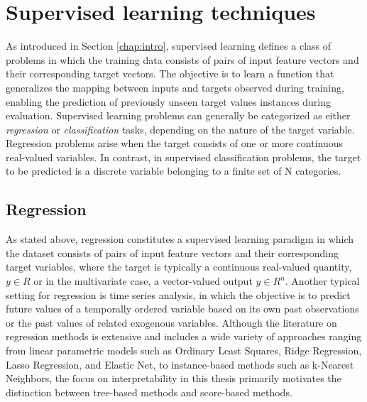 \documentclass[12pt]{report} %
\begin{document}
\chapter{Supervised learning techniques} \label{chap:supervised-learning}

As introduced in Section \ref{chap:intro}, supervised learning defines a class of problems in which the training data consists of pairs of input feature vectors and their corresponding target vectors. The objective is to learn a function that generalizes the mapping between inputs and targets observed during training, enabling the prediction of previously unseen target values instances during evaluation. Supervised learning problems can generally be categorized as either \textit{regression} or \textit{classification} tasks, depending on the nature of the target variable. Regression problems arise when the target consists of one or more continuous real-valued variables. In contrast, in supervised classification problems, the target to be predicted is a discrete variable belonging to a finite set of N categories.


\section{Regression} \label{sec:regression}

As stated above, regression constitutes a supervised learning paradigm in which the dataset consists of pairs of input feature vectors and their corresponding target variables, where the target is typically a continuous real-valued quantity, $y \in R$ or in the multivariate case, a vector-valued output $y \in R^n$. Another typical setting for regression is time series analysis, in which the objective is to predict future values of a temporally ordered variable based on its own past observations or the past values of related exogenous variables. Although the literature on regression methods is extensive and includes a wide variety of approaches ranging from linear parametric models such as Ordinary Least Squares, Ridge Regression, Lasso Regression, and Elastic Net, to instance-based methods such as k-Nearest Neighbors, the focus on interpretability in this thesis primarily motivates the distinction between tree-based methods and score-based methods.
\end{document}
